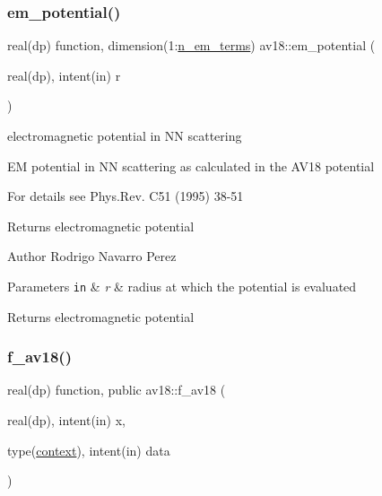 \subsubsection{\texorpdfstring{em\+\_\+potential()}{em\_potential()}}
{\footnotesize\ttfamily real(dp) function, dimension(1\+:\hyperlink{namespaceav18_abdf1bd7208851f82a6773c558de0602f}{n\+\_\+em\+\_\+terms}) av18\+::em\+\_\+potential (\begin{DoxyParamCaption}\item[{real(dp), intent(in)}]{r }\end{DoxyParamCaption})\hspace{0.3cm}{\ttfamily [private]}}



electromagnetic potential in NN scattering 

EM potential in NN scattering as calculated in the A\+V18 potential

For details see Phys.\+Rev. C51 (1995) 38-\/51

\begin{DoxyReturn}{Returns}
electromagnetic potential
\end{DoxyReturn}
\begin{DoxyAuthor}{Author}
Rodrigo Navarro Perez
\end{DoxyAuthor}

\begin{DoxyParams}[1]{Parameters}
\mbox{\tt in}  & {\em r} & radius at which the potential is evaluated\\
\hline
\end{DoxyParams}
\begin{DoxyReturn}{Returns}
electromagnetic potential 
\end{DoxyReturn}
\mbox{\label{namespaceav18_a111cfac79051da99e0b5895e5370c2bc}} 
\subsubsection{\texorpdfstring{f\+\_\+av18()}{f\_av18()}}
{\footnotesize\ttfamily real(dp) function, public av18\+::f\+\_\+av18 (\begin{DoxyParamCaption}\item[{real(dp), intent(in)}]{x,  }\item[{type(\hyperlink{structnum__recipes_1_1context}{context}), intent(in)}]{data }\end{DoxyParamCaption})}



